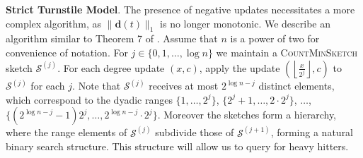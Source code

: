 \documentclass[10]{report}
\newcommand{\algoname}[1]{\textnormal{\textsc{#1}}}
\begin{document}
\textbf{Strict Turnstile Model}.
The presence of negative updates necessitates a more complex algorithm, as $\|\mathbf{d}(t)\|_1$ is no longer monotonic.
We describe an algorithm similar to Theorem 7 of \cite{cormode2005improved}.
Assume that $n$ is a power of two for convenience of notation.
For $j \in \{0, 1, \dots, \log n\}$ we maintain a \algoname{CountMinSketch} sketch $\mathcal{S}^{(j)}$.
For each degree update $(x, c)$, apply the update $\left ( \left \lfloor \frac{x}{2^j} \right \rfloor, c \right )$ to $\mathcal{S}^{(j)}$ for each $j$.
Note that $\mathcal{S}^{(j)}$ receives at most $2^{\log n - j}$ distinct elements, which correspond to the dyadic ranges $\{1, \dots, 2^j\}$, $\{2^j + 1, \dots, 2 \cdot 2^j\}$, $\dots$, $\{(2^{\log n - j} - 1) 2^j, \dots, 2^{\log n - j} \cdot 2^j\}$. 
Moreover the sketches form a hierarchy, where the range elements of $\mathcal{S}^{(j)}$ subdivide those of $\mathcal{S}^{(j+1)}$, forming a natural binary search structure.
This structure will allow us to query for heavy hitters.
\end{document}
